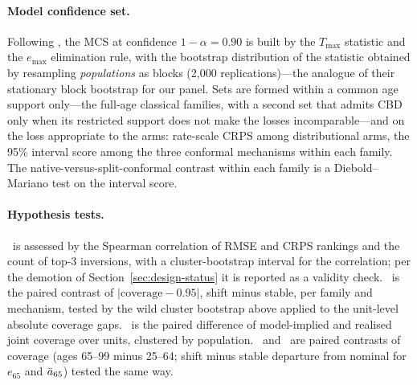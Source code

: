 \paragraph{Model confidence set.} Following \citet{hansen2011model}, the MCS
at confidence $1-\alpha=0.90$ is built by the $T_{\max}$ statistic and the
$e_{\max}$ elimination rule, with the bootstrap distribution of the
statistic obtained by resampling \emph{populations} as blocks (2{,}000
replications)---the analogue of their stationary block bootstrap for our
panel. Sets are formed within a common age support only---the full-age
classical families, with a second set that admits CBD only when its
restricted support does not make the losses incomparable---and on the loss
appropriate to the arms: rate-scale CRPS among distributional arms, the
95\% interval score among the three conformal mechanisms within each
family. The native-versus-split-conformal contrast within each family is a
Diebold--Mariano test on the interval score.

\paragraph{Hypothesis tests.} \Hone\ is assessed by the Spearman correlation
of RMSE and CRPS rankings and the count of top-3 inversions, with a
cluster-bootstrap interval for the correlation; per the demotion of
Section~\ref{sec:design-status} it is reported as a validity check.
\Htwo\ is the paired contrast of $|\text{coverage}-0.95|$, shift minus
stable, per family and mechanism, tested by the wild cluster bootstrap
above applied to the unit-level absolute coverage gaps. \Hthree\ is the
paired difference of model-implied and realised joint coverage over units,
clustered by population. \Hfour\ and \Hfive\ are paired contrasts of
coverage (ages 65--99 minus 25--64; shift minus stable departure from
nominal for $e_{65}$ and $\ddot{a}_{65}$) tested the same way.
